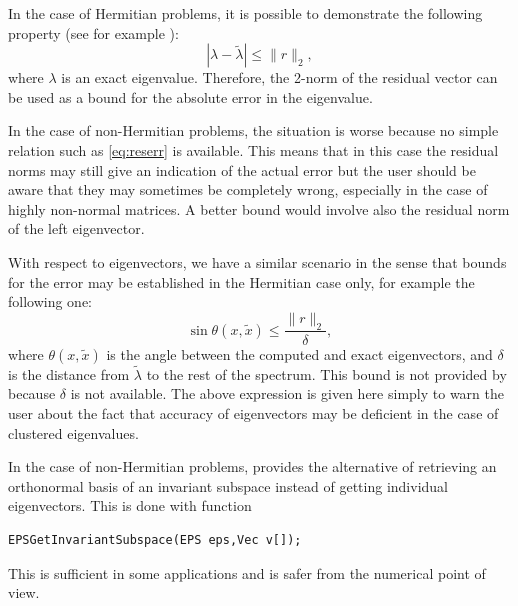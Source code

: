 In the case of Hermitian problems, it is possible to demonstrate the following property (see for example \citep[ch. 3]{Saad:1992:NML}):
\begin{equation}\label{eq:reserr}
|\lambda-\tilde{\lambda}|\leq \|r\|_2,
\end{equation}
where $\lambda$ is an exact eigenvalue. Therefore, the 2-norm of the residual vector can be used as a bound for the absolute error in the eigenvalue.

In the case of non-Hermitian problems, the situation is worse because no simple relation such as \eqref{eq:reserr} is available. This means that in this case the residual norms may still give an indication of the actual error but the user should be aware that they may sometimes be completely wrong, especially in the case of highly non-normal matrices. A better bound would involve also the residual norm of the left eigenvector.

With respect to eigenvectors, we have a similar scenario in the sense that bounds for the error may be established in the Hermitian case only, for example the following one:
\begin{equation}
\sin \theta(x,\tilde{x})\leq \frac{\|r\|_2}{\delta},
\end{equation}
where $\theta(x,\tilde{x})$ is the angle between the computed and exact eigenvectors, and $\delta$ is the distance from $\tilde{\lambda}$ to the rest of the spectrum. This bound is not provided by \slepc because $\delta$ is not available. The above expression is given here simply to warn the user about the fact that accuracy of eigenvectors may be deficient in the case of clustered eigenvalues.

In the case of non-Hermitian problems, \slepc provides the alternative of retrieving an orthonormal basis of an invariant subspace instead of getting individual eigenvectors. This is done with function
        \begin{Verbatim}[fontsize=\small]
        EPSGetInvariantSubspace(EPS eps,Vec v[]);
        \end{Verbatim}
This is sufficient in some applications and is safer from the numerical point of view.

